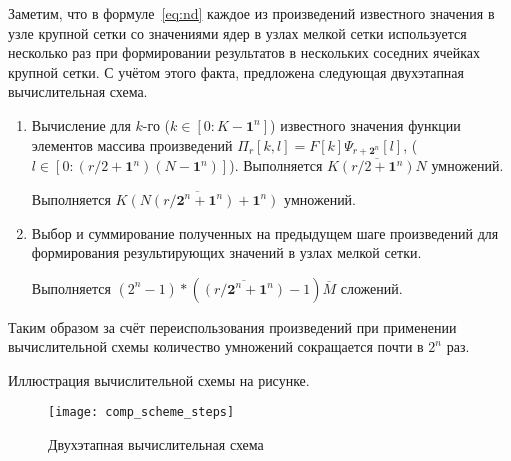 Заметим, 
что в формуле~\eqref{eq:nd} каждое из произведений известного значения в узле крупной сетки
со значениями ядер в узлах мелкой сетки используется несколько раз
при формировании результатов в нескольких соседних
ячейках 
крупной сетки. 
С учётом этого факта,
предложена следующая двухэтапная вычислительная схема.
\begin{enumerate}
\item
  Вычисление для $k$-го ($k \in [0:K-\mathbf{1}^n]$)
  известного значения функции 
  элементов массива произведений
  $\Pi_r[k,l] = F[k]\Psi_{r+\mathbf{2}^n}[l]$,
($l \in [0:(r/2+\mathbf{1}^n)(N-\mathbf{1}^n)]$).
  Выполняется %
  $\overline{K(r/2+\mathbf{1}^n)N}$ умножений.

  Выполняется $\overline{K (N(r/\mathbf{2}^n + \mathbf{1}^n) +\mathbf{1}^n)}$ умножений.

\item
  Выбор и суммирование полученных на предыдущем шаге произведений
  для формирования результирующих значений в узлах мелкой сетки.
  

  Выполняется $(2^n-1) * (\overline{(r/\mathbf{2}^n+\mathbf{1}^n)} -1)  \overline{M}$ сложений.

\end{enumerate}

Таким образом за счёт переиспользования произведений при применении вычислительной схемы
количество умножений сокращается почти в  $2^n$ раз.




Иллюстрация вычислительной схемы на рисунке.
\begin{figure}[h!]
  \centering
  \texttt{[image: comp\_scheme\_steps]} 
  \caption{Двухэтапная вычислительная схема}
  \label{fig:reg_net}
\end{figure}
\FloatBarrier







